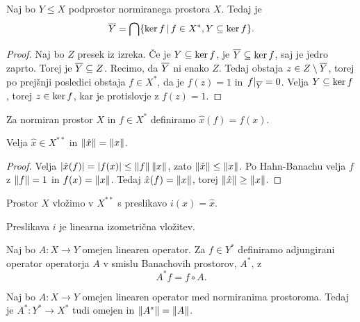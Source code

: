 \begin{izrek}
  Naj bo $Y \le X$ podprostor normiranega prostora $X$.
  Tedaj je
  \[
	\overline{Y} = \bigcap \{ \operatorname{ker} f \,|\, f \in X^*, Y \subseteq \operatorname{ker} f \}.
  \]
\end{izrek}

\begin{proof}
  Naj bo $Z$ presek iz izreka.
  Če je $Y \subseteq \operatorname{ker} f$, je $\overline{Y} \subseteq \operatorname{ker} f$, saj je jedro
  zaprto.
  Torej je $\overline{Y} \subseteq Z$.
  Recimo, da $\overline{Y}$ ni enako $Z$.
  Tedaj obstaja $z \in Z \setminus \overline{Y}$, torej po prejšnji posledici obstaja
  $f \in X^*$, da je $f(z) = 1$ in $\left. f \right|_{\overline{Y}} = 0$.
  Velja $Y \subseteq \operatorname{ker} f$, torej $z \in \operatorname{ker} f$, kar je protislovje z
  $f(z) = 1$.
\end{proof}


\begin{definicija}
  Za normiran prostor $X$ in $f \in X^*$ definiramo $\hat{x}(f) = f(x)$.
\end{definicija}

\begin{trditev}
  Velja $\hat{x} \in X^{**}$ in $\left\lVert\hat{x}\right\rVert = \left\lVert x\right\rVert$.
\end{trditev}

\begin{proof}
  Velja $\left| \hat{x}(f) \right| = \left| f(x) \right| \le \left\lVert f\right\rVert \left\lVert x\right\rVert$, zato
  $\left\lVert\hat{x}\right\rVert \le \left\lVert x\right\rVert$.
  Po Hahn-Banachu velja $f$ z $\left\lVert f\right\rVert = 1$ in $f(x) = \left\lVert x\right\rVert$.
  Tedaj $\hat{x}(f) = \left\lVert x\right\rVert$, torej $\left\lVert\hat{x}\right\rVert \ge \left\lVert x\right\rVert$.
\end{proof}

Prostor $X$ vložimo v $X^{**}$ s preslikavo $i(x) = \hat{x}$.

\begin{trditev}
  Preslikava $i$ je linearna izometrična vložitev.
\end{trditev}

Naj bo $A: X \to Y$ omejen linearen operator.
Za $f \in Y^*$ definiramo adjungirani operator operatorja $A$ v smislu
Banachovih prostorov, $A^*$, z
\[
  A^* f = f \circ A.
\]

\begin{trditev}
  Naj bo $A: X \to Y$ omejen linearen operator med normiranima prostoroma.
  Tedaj je $A^* : Y^* \to X^*$ tudi omejen in $\left\lVert A^*\right\rVert = \left\lVert A\right\rVert$.
\end{trditev}

